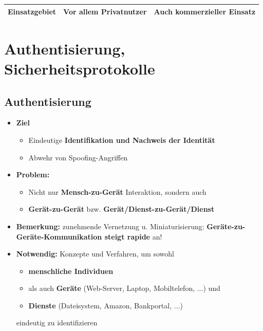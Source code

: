 \documentclass[openany]{book}
\begin{document}
\begin{table}[h!]
{\begin{tabular}{|c|c|c|}
    Einsatzgebiet                                                                               & Vor allem Privatnutzer                                                                                    & Auch kommerzieller Einsatz                                                                                                       \\ \hline
    \end{tabular}}
\end{table}

\chapter{Authentisierung, Sicherheitsprotokolle}

\section{Authentisierung}

\begin{itemize}
    \item \textbf{Ziel}
    \begin{itemize}
        \item Eindeutige \textbf{Identifikation und Nachweis der Identität}
        \item Abwehr von Spoofing-Angriffen
    \end{itemize}
    \item \textbf{Problem:}
    \begin{itemize}
        \item Nicht nur \textbf{Mensch-zu-Gerät} Interaktion, sondern auch
        \item \textbf{Gerät-zu-Gerät} bzw. \textbf{Gerät/Dienst-zu-Gerät/Dienst}
    \end{itemize}
    \item \textbf{Bemerkung:} zunehmende Vernetzung u. Miniaturisierung: \textbf{Geräte-zu-Geräte-Kommunikation steigt rapide} an!
    \item \textbf{Notwendig:} Konzepte und Verfahren, um sowohl
    \begin{itemize}
        \item \textbf{menschliche Individuen}
        \item als auch \textbf{Geräte} (Web-Server, Laptop, Mobiltelefon, ...) und
        \item \textbf{Dienste} (Dateisystem, Amazon, Bankportal, ...)
    \end{itemize}
    eindeutig zu identifizieren
\end{itemize}
\end{document}
